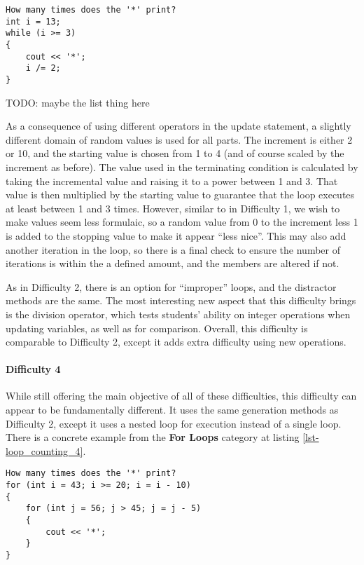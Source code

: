 \documentclass{article}
\begin{document}
\begin{lstlisting}[caption={Loop Counting Difficulty 3 Example}, label=lst-loop_counting_d3]
How many times does the '*' print?
int i = 13; 
while (i >= 3) 
{
	cout << '*'; 
	i /= 2;
}
\end{lstlisting}


TODO: maybe the list thing here 

As a consequence of using different operators in the update statement, a slightly different domain of random values is used for all parts. The increment is either 2 or 10, and the starting value 
is chosen from 1 to 4 (and of course scaled by the increment as before). The value used in the terminating condition is calculated by taking the incremental value and raising it to a power 
between 1 and 3. That value is then multiplied by the starting value to guarantee that the loop executes at least between 1 and 3 times. However, similar to in Difficulty 1, we wish to make
values seem less formulaic, so a random value from 0 to the increment less 1 is added to the stopping value to make it appear ``less nice''. This may also add another iteration in the loop,
so there is a final check to ensure the number of iterations is within the a defined amount, and the members are altered if not. 

As in Difficulty 2, there is an option for ``improper'' loops, and the distractor methods are the same. The most interesting new aspect that this difficulty brings is the division operator, which tests students' ability on integer operations
when updating variables, as well as for comparison. Overall, this difficulty is comparable to Difficulty 2, except it adds extra difficulty using new operations. 

\paragraph{Difficulty 4} \hfill \par 
While still offering the main objective of all of these difficulties, this difficulty can appear to be fundamentally different. It uses the same generation methods as Difficulty 2, except it uses 
a nested loop for execution instead of a single loop. There is a concrete example from the \textbf{For Loops} category at listing \ref{lst-loop_counting_4}.

\begin{lstlisting}[float, caption={Loop Counting Difficulty 4 Example}, label=lst-loop_counting_4]
How many times does the '*' print? 
for (int i = 43; i >= 20; i = i - 10) 
{ 
	for (int j = 56; j > 45; j = j - 5) 
	{ 
		cout << '*'; 
	} 
}
\end{lstlisting}
\end{document}
